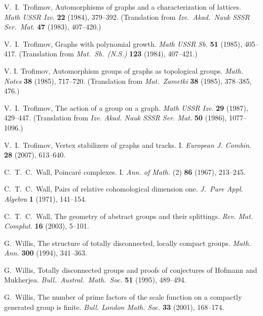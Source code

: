 \documentclass{emsprocart}
\theoremstyle{definition}
\begin{document}
\begin{thebibliography}{99}
  V.~I.~Trofimov,
                Automorphisms of graphs and a characterization of lattices.
                {\em Math USSR Izv.} {\bf 22} (1984), 379--392.
                 (Translation from {\em Izv.~Akad.~Nauk SSSR Ser.~Mat.} {\bf 47} (1983),  407--420.)

  V.~I.~Trofimov,
                Graphs with polynomial growth.
                {\em Math USSR Sb.} {\bf 51} (1985), 405--417.
(Translation from {\em Mat.~Sb.~(N.S.)} {\bf 123} (1984),  407--421.)

  V. I. Trofimov,
                Automorphism groups of graphs as topological groups.
                {\em Math. Notes} {\bf 38} (1985), 717--720.
 (Translation from {\em Mat.~Zametki} {\bf 38} (1985), 378--385, 476.)

  V.\ I.\ Trofimov,
                The action of a group on a graph.
                {\em Math USSR Izv.} {\bf 29} (1987), 429--447.
           (Translation from {\em Izv. Akad. Nauk SSSR Ser. Mat.} {\bf 50} (1986), 1077--1096.)

  V.\ I.\ Trofimov,
                Vertex stabilizers of graphs and tracks. I.
                {\em European J. Combin.} {\bf 28}  (2007), 613--640.

 C.~T.~C.~Wall,
                Poincar{\'e} complexes. I.
                {\em Ann. of Math.} (2) {\bf 86} (1967), 213--245.

 C.~T.~C.~Wall,
                Pairs of relative cohomological dimension one.
                {\em J.~Pure Appl. Algebra} {\bf 1} (1971), 141--154.

 C.~T.~C.~Wall,
                The geometry of abstract groups and their splittings.
                {\em Rev. Mat. Complut.}  {\bf 16}  (2003),   5--101.

 G.\ Willis,
                The structure of totally disconnected, locally compact
                groups.
                {\em Math. Ann.} {\bf 300} (1994), 341--363.

 G.\ Willis,
                Totally disconnected groups and proofs of conjectures
                of Hofmann and Mukherjea.
                {\em Bull.\ Austral.\ Math.\ Soc.} {\bf 51} (1995),
                489--494.

  G.~Willis,
                The number of prime factors of the scale function on a
                compactly generated group is finite.
                {\em Bull. London Math. Soc.} {\bf 33} (2001),
                168--174.


\end{thebibliography}
\end{document}
